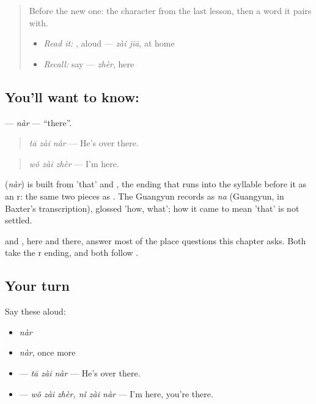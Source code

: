 \label{lesson:ZH-C85-nar}



\begin{quote}
Before the new one: the character from the last lesson, then a word it pairs with.

\begin{itemize}
\raggedright
  \item \emph{Read it:} , aloud — \emph{zài jiā}, at home
  \item \emph{Recall:} say  — \emph{zhèr}, here
\end{itemize}
\end{quote}

\subsection*{You'll want to know: }
\textbf{} — \emph{nàr} — \textquotedblleft{}there\textquotedblright{}.

\begin{quote}
\textbf{} \emph{tā zài nàr} — He's over there.
\end{quote}

\begin{quote}
\textbf{} \emph{wǒ zài zhèr} — I'm here.
\end{quote}

\begin{cousinweb}
\textbf{} (\emph{nàr}) is built from  'that' and , the ending that runs into the syllable before it as an r: the same two pieces as . The Guangyun records  as \emph{na} (Guangyun, in Baxter's transcription), glossed 'how, what'; how it came to mean 'that' is not settled.
\end{cousinweb}

\begin{grammarlens}[title={What you've built}]
 and , here and there, answer most of the place questions this chapter asks. Both take the r ending, and both follow .
\end{grammarlens}

\subsection*{Your turn}
Say these aloud:

\begin{itemize}
\raggedright
  \item \emph{nàr}
  \item \emph{nàr}, once more
  \item {} — \emph{tā zài nàr} — He's over there.
  \item {}  — \emph{wǒ zài zhèr, nǐ zài nàr} — I'm here, you're there.
\end{itemize}

